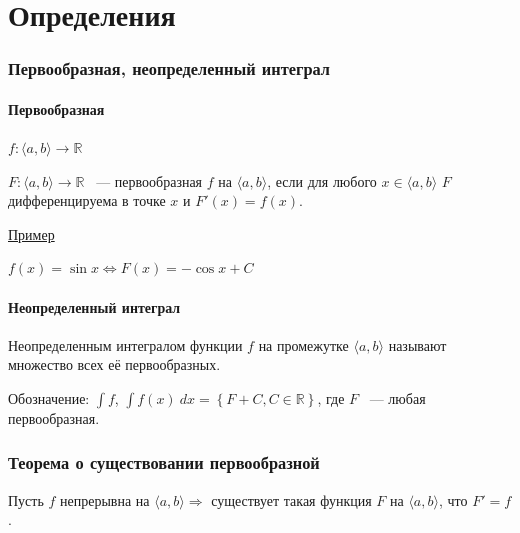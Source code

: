 \documentclass{article}
\begin{document}
\newcommand{\PG}[0]{\Pi\Gamma}
\newcommand{\Segm}[0]{\mathrm{Segm} $\ $}
\newcommand{\diam}[0]{\mathrm{diam} $\ $}
\newcommand{\Int}[0]{\mathrm{Int} $\ $}

\tableofcontents

\newpage 

\part{Определения}

	\newpage
	
	\section{Первообразная, неопределенный интеграл}
	
		\subsection{Первообразная}
	
			$f: \langle a, b \rangle \rightarrow \mathbb{R}$
	
			$F: \langle a, b \rangle \rightarrow \mathbb{R}$ ~--- первообразная $f$ на $\langle a, b \rangle$, если для любого $x \in \langle a, b \rangle$ $F$ дифференцируема в точке $x$ и $F'(x) = f(x)$.
	
			\underline{Пример}
	
			$f(x) = \sin{x} \Longleftrightarrow F(x) = -\cos{x} + C$
	
		\subsection{Неопределенный интеграл}
	
			Неопределенным интегралом функции $f$ на промежутке $\langle a, b \rangle$ называют множество всех её первообразных.
			
			Обозначение: $\int{f}$, $\int{f(x)~dx} = \left\{ F + C, C \in \mathbb{R} \right\}$, где $F$ ~--- любая первообразная.
		
	\newpage
		
	\section{Теорема о существовании первообразной}
		
		Пусть $f$ непрерывна на $\langle a, b \rangle \Longrightarrow$ существует такая функция $F$ на $\langle a, b \rangle$, что $F' = f$.
		
\end{document}
